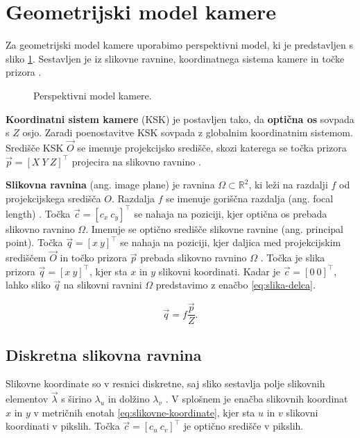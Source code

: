 \section{Geometrijski model kamere}\label{sec:model-kamere}
Za geometrijski model kamere uporabimo perspektivni model, ki je predstavljen s sliko \ref{fig:perspektivni-model}. Sestavljen je iz slikovne ravnine, koordinatnega sistema kamere in točke prizora \cite{trucco1998introductory}.


\begin{figure}[htb]
\centering

\caption{Perspektivni model kamere.}
\label{fig:perspektivni-model}
\end{figure}


\textbf{Koordinatni sistem kamere} (KSK) je postavljen tako, da \textbf{optična os} sovpada s $Z$ osjo. Zaradi poenostavitve KSK sovpada z globalnim koordinatnim sistemom.  Središče KSK $\vec{O}$ se imenuje projekcijsko središče, skozi katerega se točka prizora $\vec{p} = \left[ X~Y~Z \right]^\top$ projecira na slikovno ravnino \cite{trucco1998introductory}.

\textbf{Slikovna ravnina} (ang. image plane) je ravnina $\mathit{\Omega} \subset \mathbb{R}^2$, ki leži na razdalji $f$ od projekcijskega središča $O$. Razdalja $f$ se imenuje goriščna razdalja (ang. focal length) \cite{trucco1998introductory}. Točka $\vec{c} = \left[c_x~c_y \right]^\top$ se nahaja na poziciji, kjer optična os prebada slikovno ravnino $\mathit{\Omega}$. Imenuje se optično središče slikovne ravnine (ang. principal point). Točka $\vec{q} = [x~y]^\top$ se nahaja na poziciji, kjer daljica med projekcijskim središčem $\vec{O}$ in točko prizora $\vec{p}$ prebada slikovno ravnino $\mathit{\Omega}$ \cite{trucco1998introductory}. Točka je slika prizora $\vec{q} = [x~y]^\top$, kjer sta $x$ in $y$ slikovni koordinati. Kadar je $\vec{c} = \left[0~0\right]^\top$, lahko sliko $\vec{q}$ na slikovni ravnini $\mathit{\Omega}$ predstavimo z enačbo \eqref{eq:slika-delca}.

\begin{equation}
	\vec{q} = f \frac{\vec{p}}{Z}.
    \label{eq:slika-delca}
\end{equation}

\subsection{Diskretna slikovna ravnina}
Slikovne koordinate so v resnici diskretne, saj sliko sestavlja polje slikovnih elementov $\vec{\lambda}$ s širino $\lambda_u$ in dolžino $\lambda_v$ \cite{trucco1998introductory}. V splošnem je enačba slikovnih koordinat $x$ in $y$ v metričnih enotah \eqref{eq:slikovne-koordinate}, kjer sta $u$ in $v$ slikovni koordinati v pikslih. Točka $\vec{c} = \left[c_u~c_v \right]^\top$ je optično središče v pikslih.

